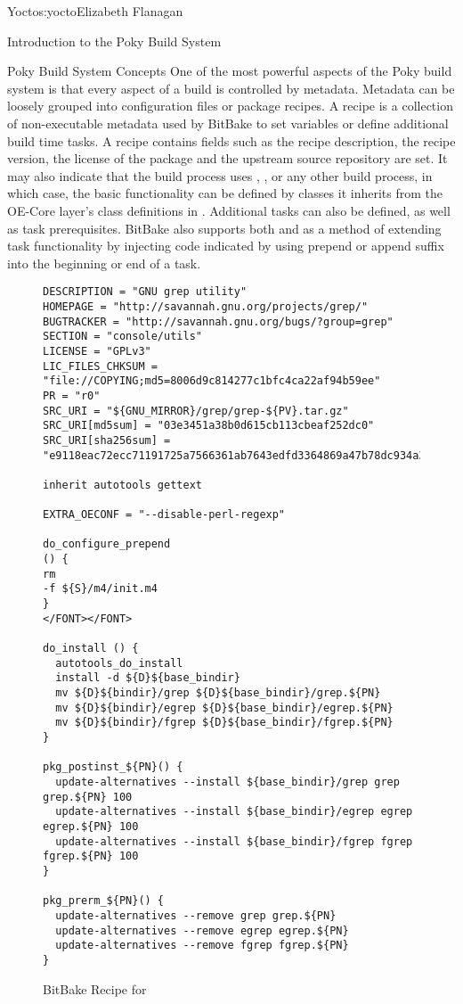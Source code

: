 \begin{aosachapter}{Yocto}{s:yocto}{Elizabeth Flanagan}
\begin{aosasect1}{Introduction to the Poky Build System}
\begin{aosasect2}{Poky Build System Concepts}
One of the most powerful aspects of the
Poky build system is that every aspect of a build is controlled by
metadata. Metadata can be loosely grouped into configuration files or
package recipes. A recipe is a
collection of non-executable
metadata used by BitBake to set variables or define additional build
time tasks. A recipe contains fields such as the recipe description,
the recipe version, the license of the package and the upstream
source repository are set. It may also indicate
that the build process uses , ,  or any
other build process, in which case, the basic functionality can be
defined by classes it inherits from
the OE-Core layer's class definitions in .
Additional tasks can also be
defined, as well as task prerequisites. BitBake
also supports both 
and  as a method of extending task functionality by injecting
code indicated by using prepend or append suffix into the beginning
or end of a task.

\begin{figure}
\begin{verbatim}
DESCRIPTION = "GNU grep utility"
HOMEPAGE = "http://savannah.gnu.org/projects/grep/"
BUGTRACKER = "http://savannah.gnu.org/bugs/?group=grep"
SECTION = "console/utils"
LICENSE = "GPLv3"
LIC_FILES_CHKSUM = "file://COPYING;md5=8006d9c814277c1bfc4ca22af94b59ee"
PR = "r0"
SRC_URI = "${GNU_MIRROR}/grep/grep-${PV}.tar.gz"
SRC_URI[md5sum] = "03e3451a38b0d615cb113cbeaf252dc0"
SRC_URI[sha256sum] = "e9118eac72ecc71191725a7566361ab7643edfd3364869a47b78dc934a357970"

inherit autotools gettext

EXTRA_OECONF = "--disable-perl-regexp"

do_configure_prepend
() {
rm
-f ${S}/m4/init.m4
}
</FONT></FONT>

do_install () {
  autotools_do_install
  install -d ${D}${base_bindir}
  mv ${D}${bindir}/grep ${D}${base_bindir}/grep.${PN}
  mv ${D}${bindir}/egrep ${D}${base_bindir}/egrep.${PN}
  mv ${D}${bindir}/fgrep ${D}${base_bindir}/fgrep.${PN}
}

pkg_postinst_${PN}() {
  update-alternatives --install ${base_bindir}/grep grep grep.${PN} 100
  update-alternatives --install ${base_bindir}/egrep egrep egrep.${PN} 100
  update-alternatives --install ${base_bindir}/fgrep fgrep fgrep.${PN} 100
}

pkg_prerm_${PN}() {
  update-alternatives --remove grep grep.${PN}
  update-alternatives --remove egrep egrep.${PN}
  update-alternatives --remove fgrep fgrep.${PN}
}
\end{verbatim}
\caption{BitBake Recipe for }
\label{fig.yocto.recipe}
\end{figure}


\end{aosasect2}
\end{aosasect1}
\end{aosachapter}
